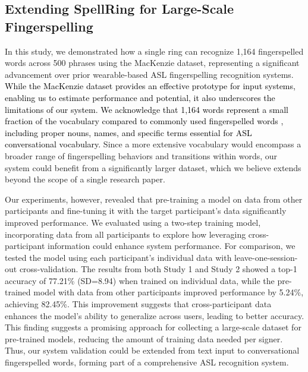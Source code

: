 \subsection{Extending SpellRing for Large-Scale Fingerspelling }

In this study, we demonstrated how a single ring can recognize 1,164 fingerspelled words across 500 phrases using the MacKenzie dataset, representing a significant advancement over prior wearable-based ASL fingerspelling recognition systems. \textcolor{black}{ While the MacKenzie dataset provides an effective prototype for input systems, enabling us to estimate performance and potential, it also underscores the limitations of our system. We acknowledge that 1,164 words represent a small fraction of the vocabulary compared to commonly used fingerspelled words \cite{shi2018american}, including proper nouns, names, and specific terms essential for ASL conversational vocabulary.}
Since a more extensive vocabulary would encompass a broader range of fingerspelling behaviors and transitions within words, our system could benefit from a significantly larger dataset, which we believe extends beyond the scope of a single research paper. 

Our experiments, however, revealed that pre-training a model on data from other participants and fine-tuning it with the target participant's data significantly improved performance. We evaluated \theDevice{} using a two-step training model, incorporating data from all participants to explore how leveraging cross-participant information could enhance system performance. For comparison, we tested the model using each participant’s individual data with leave-one-session-out cross-validation. The results from both Study 1 and Study 2 showed a top-1 accuracy of 77.21\% (SD=8.94) when trained on individual data, while the pre-trained model with data from other participants improved performance by 5.24\%, achieving 82.45\%. This improvement suggests that cross-participant data enhances the model's ability to generalize across users, leading to better accuracy. This finding suggests a promising approach for collecting a large-scale dataset for pre-trained models, reducing the amount of training data needed per signer. Thus, our system validation could be extended from text input to conversational fingerspelled words, forming part of a comprehensive ASL recognition system.




